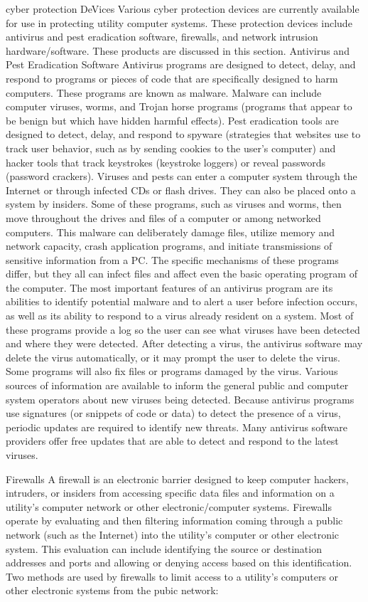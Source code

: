\documentclass{article}
\begin{document}
cyber protection DeVices Various cyber protection devices are currently
available for use in protecting utility computer systems. These
protection devices include antivirus and pest eradication software,
firewalls, and network intrusion hardware/software. These products are
discussed in this section. Antivirus and Pest Eradication Software
Antivirus programs are designed to detect, delay, and respond to
programs or pieces of code that are specifically designed to harm
computers. These programs are known as malware. Malware can include
computer viruses, worms, and Trojan horse programs (programs that appear
to be benign but which have hidden harmful effects). Pest eradication
tools are designed to detect, delay, and respond to spyware (strategies
that websites use to track user behavior, such as by sending cookies to
the user's computer) and hacker tools that track keystrokes (keystroke
loggers) or reveal passwords (password crackers). Viruses and pests can
enter a computer system through the Internet or through infected CDs or
flash drives. They can also be placed onto a system by insiders. Some of
these programs, such as viruses and worms, then move throughout the
drives and files of a computer or among networked computers. This
malware can deliberately damage files, utilize memory and network
capacity, crash application programs, and initiate transmissions of
sensitive information from a PC. The specific mechanisms of these
programs differ, but they all can infect files and affect even the basic
operating program of the computer. The most important features of an
antivirus program are its abilities to identify potential malware and to
alert a user before infection occurs, as well as its ability to respond
to a virus already resident on a system. Most of these programs provide
a log so the user can see what viruses have been detected and where they
were detected. After detecting a virus, the antivirus software may
delete the virus automatically, or it may prompt the user to delete the
virus. Some programs will also fix files or programs damaged by the
virus. Various sources of information are available to inform the
general public and computer system operators about new viruses being
detected. Because antivirus programs use signatures (or snippets of code
or data) to detect the presence of a virus, periodic updates are
required to identify new threats. Many antivirus software providers
offer free updates that are able to detect and respond to the latest
viruses.

Firewalls A firewall is an electronic barrier designed to keep computer
hackers, intruders, or insiders from accessing specific data files and
information on a utility's computer network or other electronic/computer
systems. Firewalls operate by evaluating and then filtering information
coming through a public network (such as the Internet) into the
utility's computer or other electronic system. This evaluation can
include identifying the source or destination addresses and ports and
allowing or denying access based on this identification. Two methods are
used by firewalls to limit access to a utility's computers or other
electronic systems from the pubic network:
\end{document}
